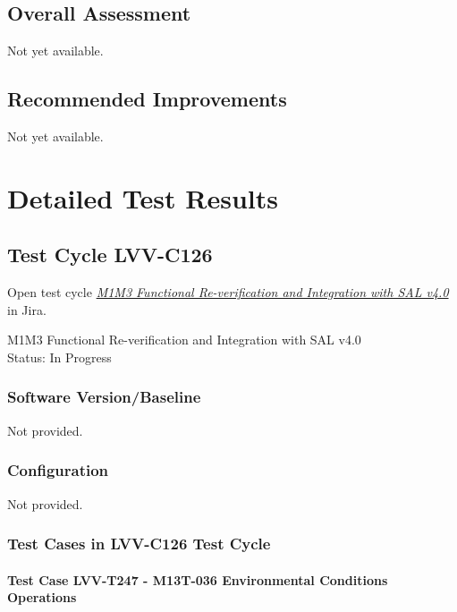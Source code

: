 \documentclass[SE,lsstdraft,STR,toc]{lsstdoc}
\begin{document}
\subsection{Overall Assessment}
\label{sect:overallassessment}

Not yet available.

\subsection{Recommended Improvements}
\label{sect:recommendations}

Not yet available.

\newpage
\section{Detailed Test Results}
\label{sect:detailedtestresults}

\subsection{Test Cycle LVV-C126 }

Open test cycle {\it \href{https://jira.lsstcorp.org/secure/Tests.jspa#/testrun/LVV-C126}{M1M3 Functional Re-verification and Integration with SAL v4.0}} in Jira.

M1M3 Functional Re-verification and Integration with SAL v4.0\\
Status: In Progress



\subsubsection{Software Version/Baseline}
Not provided.

\subsubsection{Configuration}
Not provided.

\subsubsection{Test Cases in LVV-C126 Test Cycle}

\paragraph{Test Case LVV-T247 - M13T-036 Environmental Conditions Operations }\mbox{}\\
\end{document}
